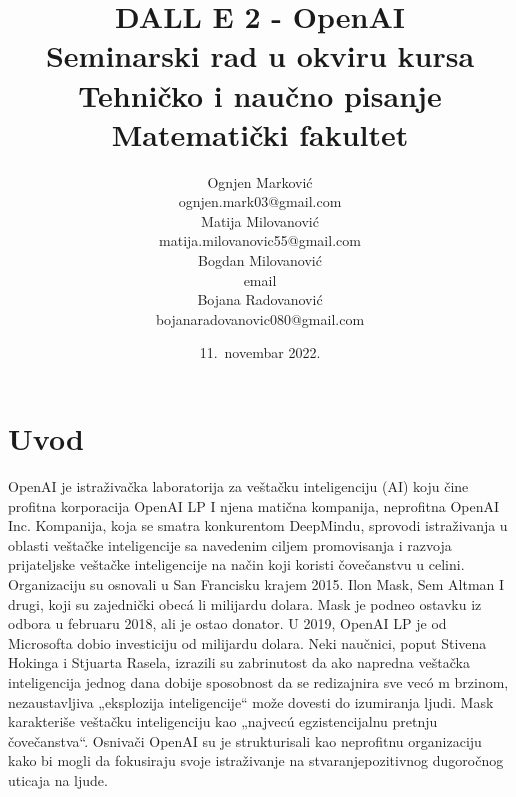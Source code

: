 \documentclass[a4paper]{article}
\begin{document}
\title{DALL E 2 - OpenAI\\ \small{Seminarski rad u okviru kursa\\Tehničko i naučno pisanje\\ Matematički fakultet}}

\author{Ognjen Marković\\ ognjen.mark03@gmail.com\\ Matija Milovanović\\ matija.milovanovic55@gmail.com\\ Bogdan Milovanović\\ email\\ Bojana Radovanović\\ bojanaradovanovic080@gmail.com }
\date{11.~novembar 2022.}
\maketitle


\tableofcontents

\newpage

\section{Uvod}
\label{sec:uvod}
OpenAI je istraživačka laboratorija za veštačku inteligenciju (AI) koju čine profitna korporacija OpenAI LP I njena matična kompanija, neprofitna OpenAI Inc. Kompanija, koja se smatra konkurentom DeepMindu, sprovodi istraživanja u oblasti veštačke inteligencije sa navedenim ciljem promovisanja i razvoja prijateljske veštačke inteligencije na način koji koristi čovečanstvu u celini. Organizaciju su osnovali u San Francisku krajem 2015. Ilon Mask, Sem Altman I drugi, koji su zajednički obecá li milijardu dolara. Mask je podneo ostavku iz odbora u februaru 2018, ali je ostao donator. U 2019, OpenAI LP je od Microsofta dobio investiciju od milijardu dolara. Neki naučnici, poput Stivena Hokinga i Stjuarta Rasela, izrazili su zabrinutost da ako napredna veštačka inteligencija jednog dana dobije sposobnost da se redizajnira sve vecó m brzinom, nezaustavljiva „eksplozija inteligencije“ može dovesti do izumiranja ljudi. Mask karakteriše veštačku inteligenciju kao „najvecú egzistencijalnu pretnju čovečanstva“. Osnivači OpenAI su je strukturisali kao neprofitnu organizaciju kako bi mogli da fokusiraju svoje istraživanje na stvaranjepozitivnog dugoročnog uticaja na ljude.
\end{document}
